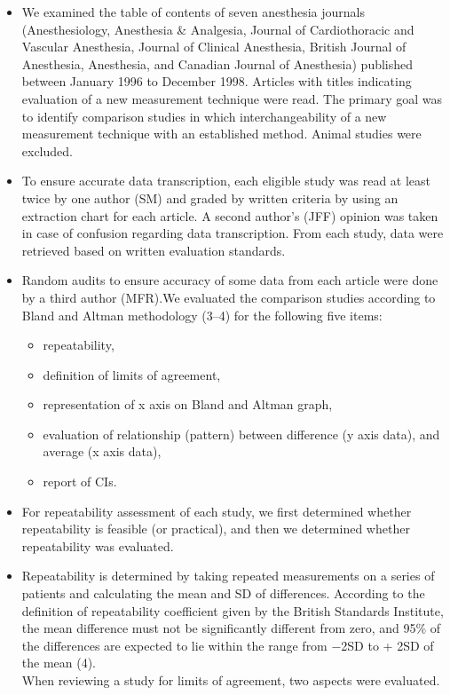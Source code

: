 \documentclass[MAIN.tex]{subfiles}
\begin{document}
	\begin{itemize}
		\item We examined the table of contents of seven anesthesia journals (Anesthesiology, Anesthesia \& Analgesia, Journal of Cardiothoracic and Vascular Anesthesia, Journal of Clinical Anesthesia, British Journal of Anesthesia, Anesthesia, and Canadian Journal of Anesthesia) published between January 1996 to December 1998. Articles with titles indicating evaluation of a new measurement technique were read. The primary goal was to identify comparison studies in which interchangeability of a new measurement technique with an established method. Animal studies were excluded. 
		\item To ensure accurate data transcription, each eligible study was read at least twice by one author (SM) and graded by written criteria by using an extraction chart for each article. A second author’s (JFF) opinion was taken in case of confusion regarding data transcription. From each study, data were retrieved based on written evaluation standards. 
		\item Random audits to ensure accuracy of some data from each article were done by a third author (MFR).We evaluated the comparison studies according to Bland and Altman methodology (3–4) for the following five items: 
		\begin{itemize}
			\item repeatability, 
			\item definition of limits of agreement, 
			\item representation of x axis on Bland and Altman graph, 
			\item evaluation of relationship (pattern) between difference (y axis data), and average (x axis data), 
			\item report of CIs. 
		\end{itemize}
		\item For repeatability assessment of each study, we first determined whether repeatability is feasible (or practical), and then we determined whether repeatability was evaluated. 
		\item Repeatability is determined by taking repeated measurements on a series of patients and calculating the mean and SD of differences. According to the definition of repeatability coefficient given by the British Standards Institute, the mean difference must not be significantly different from zero, and 95\% of the differences are expected to lie within the range from −2SD to + 2SD of the mean (4). \\ When reviewing a study for limits of agreement, two aspects were evaluated. 
		

\end{itemize}
\end{document}
